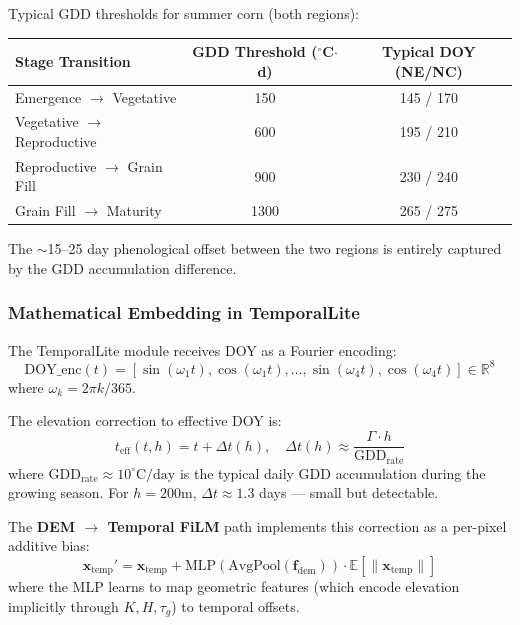 Typical GDD thresholds for summer corn (both regions):
\begin{center}
\begin{tabular}{lcc}
\toprule
\textbf{Stage Transition} & \textbf{GDD Threshold ($^\circ$C$\cdot$d)} & \textbf{Typical DOY (NE/NC)} \\
\midrule
Emergence $\to$ Vegetative & 150 & 145 / 170 \\
Vegetative $\to$ Reproductive & 600 & 195 / 210 \\
Reproductive $\to$ Grain Fill & 900 & 230 / 240 \\
Grain Fill $\to$ Maturity & 1300 & 265 / 275 \\
\bottomrule
\end{tabular}
\end{center}

The $\sim$15--25 day phenological offset between the two regions is entirely
captured by the GDD accumulation difference.

\subsubsection{Mathematical Embedding in TemporalLite}

The TemporalLite module receives DOY as a Fourier encoding:
\begin{equation}
    \text{DOY\_enc}(t) = [\sin(\omega_1 t), \cos(\omega_1 t), \ldots,
    \sin(\omega_4 t), \cos(\omega_4 t)] \in \mathbb{R}^8
\end{equation}
where $\omega_k = 2\pi k / 365$.

The elevation correction to effective DOY is:
\begin{equation}
    t_{\text{eff}}(t, h) = t + \Delta t(h), \quad
    \Delta t(h) \approx \frac{\Gamma \cdot h}{\text{GDD}_{\text{rate}}}
\end{equation}
where $\text{GDD}_{\text{rate}} \approx 10^\circ\text{C/day}$ is the typical
daily GDD accumulation during the growing season. For $h = 200\text{m}$,
$\Delta t \approx 1.3$ days — small but detectable.

The \textbf{DEM $\to$ Temporal FiLM} path implements this correction as a
per-pixel additive bias:
\begin{equation}
    \mathbf{x}_{\text{temp}}' = \mathbf{x}_{\text{temp}} +
    \text{MLP}(\text{AvgPool}(\mathbf{f}_{\text{dem}})) \cdot
    \mathbb{E}[\|\mathbf{x}_{\text{temp}}\|]
\end{equation}
where the MLP learns to map geometric features (which encode elevation
implicitly through $K, H, \tau_g$) to temporal offsets.

